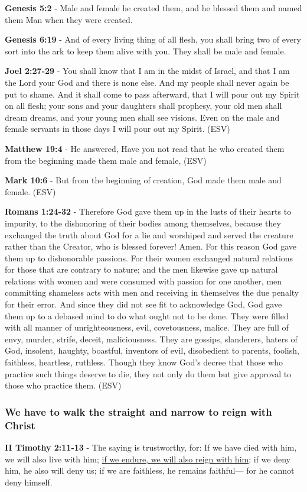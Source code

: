 \documentclass[11pt]{article}
\begin{document}
\textbf{Genesis 5:2} - Male and female he created them, and he blessed them and named them Man when they were created.

\textbf{Genesis 6:19} - And of every living thing of all flesh, you shall bring two of every sort into the ark to keep them alive with you. They shall be male and female.

\textbf{Joel 2:27-29} - You shall know that I am in the midst of Israel, and that I am the Lord your God and there is none else. And my people shall never again be put to shame. And it shall come to pass afterward, that I will pour out my Spirit on all flesh; your sons and your daughters shall prophesy, your old men shall dream dreams, and your young men shall see visions. Even on the male and female servants in those days I will pour out my Spirit. (ESV)

\textbf{Matthew 19:4} - He answered, Have you not read that he who created them from the beginning made them male and female, (ESV)

\textbf{Mark 10:6} - But from the beginning of creation, God made them male and female. (ESV)

\textbf{Romans 1:24-32} - Therefore God gave them up in the lusts of their hearts to impurity, to the dishonoring of their bodies among themselves, because they exchanged the truth about God for a lie and worshiped and served the creature rather than the Creator, who is blessed forever! Amen. For this reason God gave them up to dishonorable passions. For their women exchanged natural relations for those that are contrary to nature; and the men likewise gave up natural relations with women and were consumed with passion for one another, men committing shameless acts with men and receiving in themselves the due penalty for their error. And since they did not see fit to acknowledge God, God gave them up to a debased mind to do what ought not to be done. They were filled with all manner of unrighteousness, evil, covetousness, malice. They are full of envy, murder, strife, deceit, maliciousness. They are gossips, slanderers, haters of God, insolent, haughty, boastful, inventors of evil, disobedient to parents, foolish, faithless, heartless, ruthless. Though they know God's decree that those who practice such things deserve to die, they not only do them but give approval to those who practice them. (ESV)

\subsubsection{We have to walk the straight and narrow to reign with Christ}
\label{sec:orgfbbe837}
\textbf{II Timothy 2:11-13} - The saying is trustworthy, for: If we have died with him, we will also live with him; \uline{if we endure, we will also reign with him}; if we deny him, he also will deny us; if we are faithless, he remains faithful— for he cannot deny himself.
\end{document}
